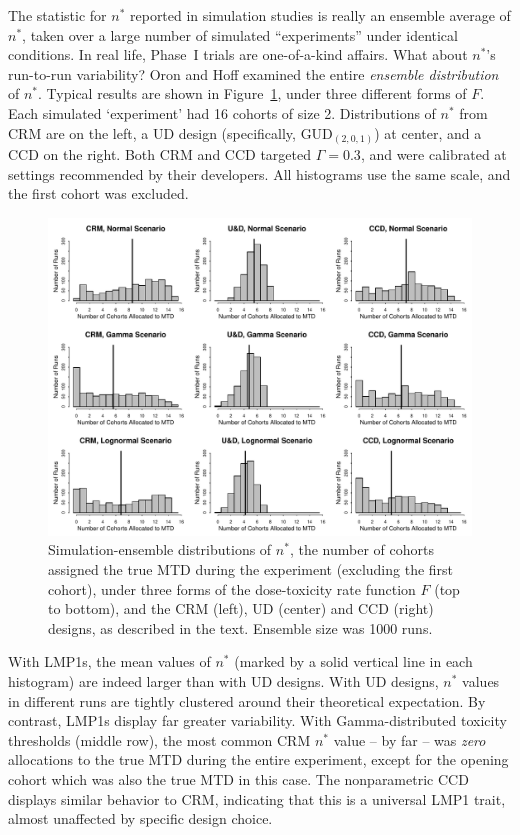 The statistic for $n^*$ reported in simulation studies is really an ensemble average of $n^*$, taken over a large number of simulated ``experiments'' under identical conditions. In real life, Phase~I trials are one-of-a-kind affairs. What about $n^*$'s run-to-run variability? Oron and Hoff \citep{Oron:Hoff:smal:2013} examined the entire \emph{ensemble distribution} of $n^*$. Typical results are shown in Figure~\ref{fig:nstar}, under three different forms of $F$. Each simulated `experiment' had 16 cohorts of size 2. Distributions of $n^*$ from CRM are on the left, a UD design (specifically, GUD$_{(2,0,1)}$) at center, and a CCD on the right. Both CRM and CCD targeted $\Gamma=0.3$, and were calibrated at settings recommended by their developers. All histograms use the same scale, and the first cohort was excluded.

\begin{figure}[!ht]
\begin{center}
\includegraphics[scale=0.73]{nstar}
\end{center}
\caption{Simulation-ensemble distributions of $n^*$, the number of cohorts assigned the true MTD during the experiment  (excluding the first cohort), under three forms of the dose-toxicity rate function $F$ (top to bottom), and the CRM (left),  UD (center) and CCD (right) designs, as described in the text. Ensemble size was 1000 runs.}\label{fig:nstar}
\end{figure}

With LMP1s, the mean values of $n^*$ (marked by a solid vertical line in each histogram) are indeed larger than with UD designs. With UD designs, $n^*$ values in different runs are tightly clustered around their theoretical expectation. By contrast, LMP1s display far greater variability. With Gamma-distributed toxicity thresholds (middle row), the most common CRM $n^*$ value -- by far -- was \emph{zero} allocations to the true MTD during the entire experiment, except for the opening cohort which was also the true MTD in this case. The nonparametric CCD displays similar behavior to CRM, indicating that this is a universal LMP1 trait, almost unaffected by specific design choice.

